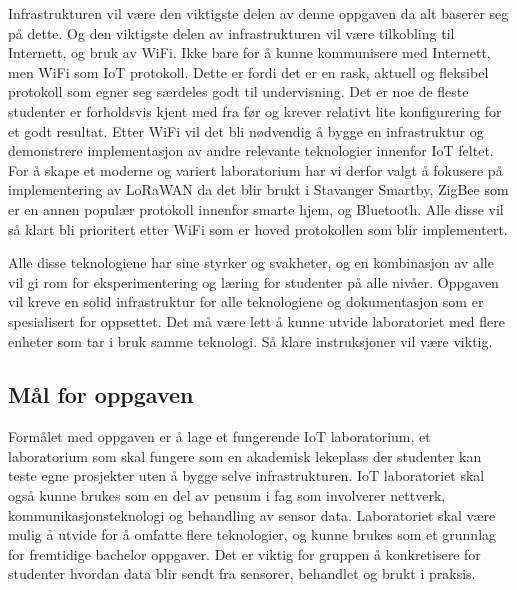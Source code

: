 \documentclass{article}
\begin{document}
Infrastrukturen vil være den viktigste delen av denne oppgaven da alt baserer seg på dette. Og den viktigste delen av infrastrukturen vil være tilkobling til Internett, og bruk av WiFi. Ikke bare for å kunne kommunisere med Internett, men WiFi som IoT protokoll. Dette er fordi det er en rask, aktuell og fleksibel protokoll som egner seg særdeles godt til undervisning. Det er noe de fleste studenter er forholdsvis kjent med fra før og krever relativt lite konfigurering for et godt resultat. Etter WiFi vil det bli nødvendig å bygge en infrastruktur og demonstrere implementasjon av andre relevante teknologier innenfor IoT feltet. For å skape et moderne og variert laboratorium har vi derfor valgt å fokusere på implementering av LoRaWAN da det blir brukt i Stavanger Smartby, ZigBee som er en annen populær protokoll innenfor smarte hjem, og Bluetooth. Alle disse vil så klart bli prioritert etter WiFi som er hoved protokollen som blir implementert.

Alle disse teknologiene har sine styrker og svakheter, og en kombinasjon av alle vil gi rom for eksperimentering og læring for studenter på alle nivåer. Oppgaven vil kreve en solid infrastruktur for alle teknologiene og dokumentasjon som er spesialisert for oppsettet. Det må være lett å kunne utvide laboratoriet med flere enheter som tar i bruk samme teknologi. Så klare instruksjoner vil være viktig.

\subsection{Mål for oppgaven}
Formålet med oppgaven er å lage et fungerende IoT laboratorium, et laboratorium som skal fungere som en akademisk lekeplass der studenter kan teste egne prosjekter uten å bygge selve infrastrukturen. IoT laboratoriet skal også kunne brukes som en del av pensum i fag som involverer nettverk, kommunikasjonsteknologi og behandling av sensor data. Laboratoriet skal være mulig å utvide for å omfatte flere teknologier, og kunne brukes som et grunnlag for fremtidige bachelor oppgaver. Det er viktig for gruppen å konkretisere for studenter hvordan data blir sendt fra sensorer, behandlet og brukt i praksis. 
\end{document}

